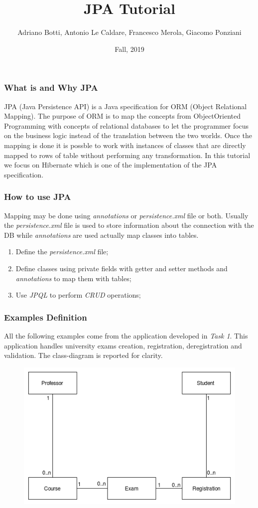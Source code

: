 \documentclass{beamer}
\title{JPA Tutorial}
\author{Adriano Botti, Antonio Le Caldare, Francesco Merola, Giacomo Ponziani}
\institute{Information Systems, University of Pisa}
\date{Fall, 2019}
\begin{document}
\frame{\titlepage}

\begin{frame}
\frametitle{What is and Why JPA}
JPA (Java Persistence API) is a Java specification for ORM (Object Relational Mapping). The purpose of ORM is to map the concepts from ObjectOriented Programming with concepts of relational databases to let the programmer focus on the business logic instead of the translation between the two worlds. Once the mapping is done it is possble to work with instances of classes that are directly mapped to rows of table without performing any transformation. \newline\newline
In this tutorial we focus on Hibernate which is one of the implementation of the JPA specification. 
\end{frame}

\begin{frame}
\frametitle{How to use JPA}
Mapping may be done using \textit{annotations} or \textit{persistence.xml} file or both. Usually the \textit{persistence.xml} file is used to store information about the connection with the DB while \textit{annotations} are used actually map classes into tables.
\begin{enumerate}
\item Define the \textit{persistence.xml} file;
\item Define classes using private fields with getter and setter methods and \textit{annotations} to map them with tables;
\item Use \textit{JPQL} to perform \textit{CRUD} operations;
\end{enumerate}
\end{frame}

\begin{frame}
\frametitle{Examples Definition}
All the following examples come from the application developed in \textit{Task 1}. This application handles university exams creation, registration, deregistration and validation.
The class-diagram is reported for clarity.
\linebreak
\begin{figure}
\includegraphics[scale=0.45]{ClassDiagram.png}
\centering
\end{figure}
\end{frame}
\end{document}
